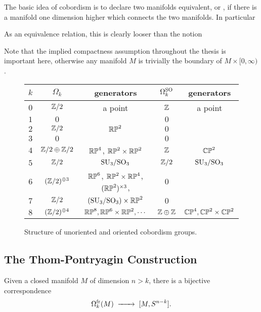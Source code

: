 The basic idea of cobordism is to declare two manifolds equivalent, or , if there is a manifold one dimension higher which connects the two manifolds. In particular 

As an equivalence relation, this is clearly looser than the notion 

\begin{remark}
	Note that the implied compactness assumption throughout the thesis is important here, otherwise any manifold $M$ is trivially the boundary of $M\times [0,\infty)$. 
\end{remark}

\begin{figure}[ht]
	\renewcommand{\arraystretch}{1.2}
	\centering
	\begin{tabular}{r||c|c||c|c}
		$k$ & $\Omega_k$ & generators & $\Omega_k^{\mathrm{SO}}$ & generators \\
		\hline
		$0$ & $\mathbb{Z}/2$ & a point & $\mathbb{Z}$ & a point\\
		$1$ & $0$ & & $0$ & \\
		$2$ & $\mathbb{Z}/2$ & $\mathbb{RP}^2$ & $0$ & \\
		$3$ & $0$ & & $0$ & \\
		$4$ & $\mathbb{Z}/2\oplus \mathbb{Z}/2$ & $\mathbb{RP}^4$, $\mathbb{RP}^2\times \mathbb{RP}^2$ & $\mathbb{Z}$ & $\mathbb{CP}^2$ \\
		$5$ & $\mathbb{Z}/2$ & $\mathrm{SU}_3/\mathrm{SO}_3$ & $\mathbb{Z}/2$ & $\mathrm{SU}_3/\mathrm{SO}_3$\\
		$6$ & $(\mathbb{Z}/2)^{\oplus 3}$ & $\mathbb{RP}^6$, $\mathbb{RP}^2\times \mathbb{RP}^4$, $(\mathbb{RP}^2)^{\times 3}$, & $0$ & \\ 
		$7$ & $\mathbb{Z}/2$ & $(\mathrm{SU}_3/\mathrm{SO}_3) \times \mathbb{RP}^2$ & $0$ & \\ 
		$8$ & $(\mathbb{Z}/2)^{\oplus 4}$ & $\mathbb{RP}^8, \mathbb{RP}^6\times \mathbb{RP}^2, \cdots$ & $\mathbb{Z}\oplus \mathbb{Z}$ & $\mathbb{CP}^4, \mathbb{CP}^2\times \mathbb{CP}^2$\\
	\end{tabular}
	\medskip
	\caption{Structure of unoriented and oriented cobordism groups.}\label{fig:cobordism-structure-table}
\end{figure}

\subsection{The Thom-Pontryagin Construction}

\begin{theorem}
  Given a closed manifold $M$ of dimension $n>k$, there is a bijective correspondence
  \[
    \Omega^\fr_k(M) \lkxto[] [M, S^{n-k}].
  \]
\end{theorem}

